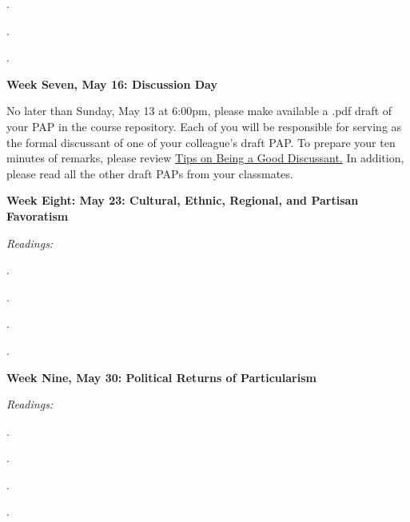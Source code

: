 \documentclass[11pt]{article}
\begin{document}
\href{http://dx.doi.org/10.1017/CBO9780511585869.008}{}.

\href{http://journals.sagepub.com/doi/abs/10.1177/0010414012463897}{}.

\href{https://onlinelibrary.wiley.com/doi/full/10.1111/ecpo.12070}{}.

\textbf {Week Seven, May 16: Discussion Day}

No later than Sunday, May 13 at 6:00pm, please make available a .pdf draft of your PAP in the course repository. Each of you will be responsible for serving as the formal discussant of one of your colleague's
draft PAP. To prepare your ten minutes of remarks, please review \href{http://sites.utexas.edu/ecoadvising/files/2012/05/ESP-Tips-on-being-a-good-discussant1.pdf}{Tips on Being a Good Discussant.}  In addition, please read all the other draft PAPs from your classmates.

\textbf{Week Eight: May 23: Cultural, Ethnic, Regional, and Partisan Favoratism}

\textit{Readings:}


\href{DOI: http://dx.doi.org/10.1017/S1537592713001035}{}. 

\href{http://dx.doi.org/10.1017/S0003055412000573}{}. 

\href{https://www.cambridge.org/core/journals/american-political-science-review/article/presidential-influence-in-an-era-of-congressional-dominance/59CDE5E3659F0A46A48DEC629E801845}{}.

\href{http://journals.sagepub.com/doi/abs/10.1177/0010414017710255}{}.

\textbf{Week Nine, May 30: Political Returns of Particularism}

\textit{Readings:}

\href{doi: 10.1177/0010414009332126}{}.

\href{http://www.jstor.org/stable/23496658}{}.

\href{https://www.cambridge.org/core/journals/british-journal-of-political-science/article/testing-models-of-distributive-politics-using-exit-polls-to-measure-voters-preferences-and-partisanship/1B188A486A0BE90F405E0BD959B7FD47}{}.

\href{https://www.cambridge.org/core/journals/journal-of-modern-african-studies/article/div-classtitlenon-discretionary-resource-allocation-as-political-investment-evidence-from-ghanadiv/4C83D492B7B6296786D629B94BBCBB0E}{}.
\end{document}
